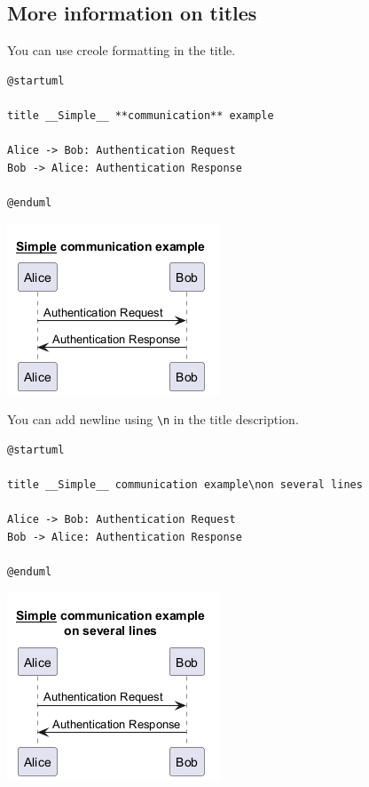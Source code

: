 \subsection{More information on titles}


You can use creole formatting in the title.


\begin{verbatim}
@startuml

title __Simple__ **communication** example

Alice -> Bob: Authentication Request
Bob -> Alice: Authentication Response

@enduml
\end{verbatim}
\begin{center}
\includegraphics[scale=0.60]{imgw/img-1121d5f5f9130f0ff9a0abdafbad0bcd.png}
\end{center}
You can add newline using \texttt{\textbackslash n} in the title description.
\begin{verbatim}
@startuml

title __Simple__ communication example\non several lines

Alice -> Bob: Authentication Request
Bob -> Alice: Authentication Response

@enduml
\end{verbatim}
\begin{center}
\includegraphics[scale=0.60]{imgw/img-79979f5af15b77af1d0985c873b87ebe.png}
\end{center}
